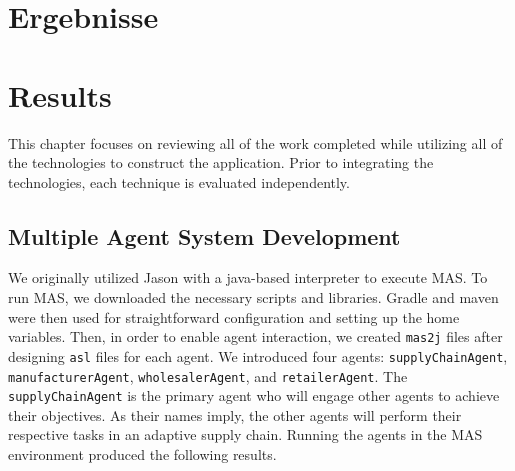 {\chapter{Ergebnisse}}
{\chapter{Results}}

\label{sec:results}

This chapter focuses on reviewing all of the work completed while utilizing all of the technologies to construct the application. Prior to integrating the technologies, each technique is evaluated independently.

\section{Multiple Agent System Development}

We originally utilized Jason with a java-based interpreter to execute \ac{MAS}. To run \ac{MAS}, we downloaded the necessary scripts and libraries. Gradle and maven were then used for straightforward configuration and setting up the home variables. Then, in order to enable agent interaction, we created \texttt{mas2j} files after designing \texttt{asl} files for each agent. We introduced four agents: \texttt{supplyChainAgent}, \texttt{manufacturerAgent}, \texttt{wholesalerAgent}, and \texttt{retailerAgent}. The \texttt{supplyChainAgent} is the primary agent who will engage other agents to achieve their objectives. As their names imply, the other agents will perform their respective tasks in an adaptive supply chain. Running the agents in the \ac{MAS} environment produced the following results.

\vspace{.5cm}

